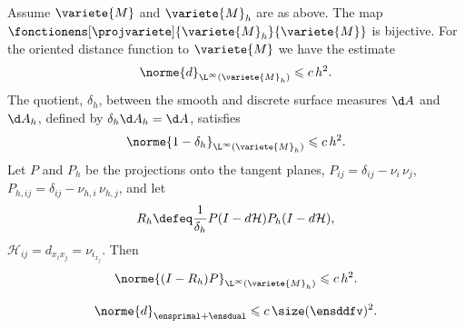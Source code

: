 \begin{lemme} \label{lemme:projection_dziuk}
Assume $\variete{M}$ and $\variete{M}_h$ are as above. The map $\fonctionens[\projvariete]{\variete{M}_h}{\variete{M}}$ is bijective. For the oriented distance function to $\variete{M}$ we have the estimate
\[
\norme{d}_{\L^\infty(\variete{M}_h)} \leqslant c \, h^2.
\]
The quotient, $\delta_h$, between the smooth and discrete surface measures $\d A$ and $\d A_h$, defined by $\delta_h \d A_h = \d A$, satisfies
\[
\norme{1 - \delta_h}_{\L^\infty(\variete{M}_h)} \leqslant c \, h^2.
\]
Let $P$ and $P_h$ be the projections onto the tangent planes, $P_{ij} = \delta_{ij} - \nu_i \, \nu_j$, $P_{h,ij} = \delta_{ij} - \nu_{h,i} \, \nu_{h,j}$, and let
\[
R_h \defeq \frac{1}{\delta_h} P(I - d\mathcal{H}) P_h (I - d\mathcal{H}),
\]
$\mathcal{H}_{ij} = d_{x_i x_j} = \nu_{i_{x_j}}$. Then
\[
\norme{(I - R_h) P}_{\L^\infty(\variete{M}_h)} \leqslant c \, h^2.
\]
\end{lemme}

\begin{lemme}
{\color{red}
\[
\norme{d}_{\ensprimal + \ensdual} \leqslant c \, \size(\ensddfv)^2.
\]
}
\end{lemme}

\begin{lemme}
\end{lemme}

